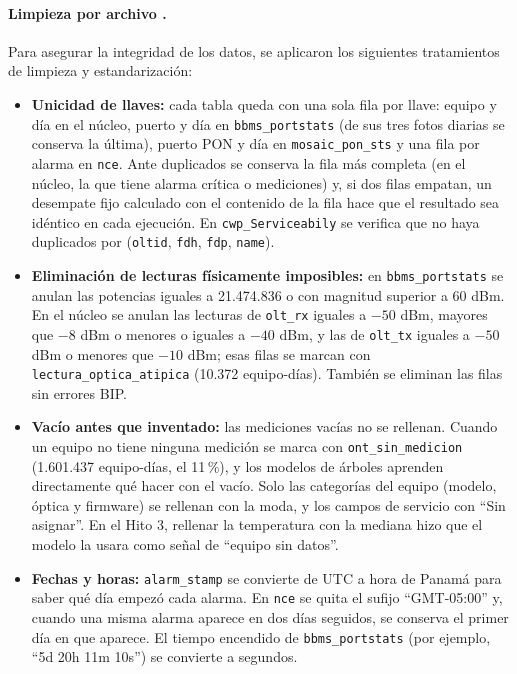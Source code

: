 \documentclass[12pt,a4paper]{article}
\begin{document}
\paragraph{Limpieza por archivo .}
Para asegurar la integridad de los datos, se aplicaron los siguientes tratamientos de limpieza y estandarización:
\begin{itemize}
    \item \textbf{Unicidad de llaves:} cada tabla queda con una sola fila por llave: equipo y día en el núcleo, puerto y día en \texttt{bbms\_portstats} (de sus tres fotos diarias se conserva la última), puerto PON y día en \texttt{mosaic\_pon\_sts} y una fila por alarma en \texttt{nce}. Ante duplicados se conserva la fila más completa (en el núcleo, la que tiene alarma crítica o mediciones) y, si dos filas empatan, un desempate fijo calculado con el contenido de la fila hace que el resultado sea idéntico en cada ejecución. En \texttt{cwp\_Serviceabily} se verifica que no haya duplicados por (\texttt{oltid}, \texttt{fdh}, \texttt{fdp}, \texttt{name}).
    \item \textbf{Eliminación de lecturas físicamente imposibles:} en \texttt{bbms\_portstats} se anulan las potencias iguales a 21.474.836 o con magnitud superior a 60 dBm. En el núcleo se anulan las lecturas de \texttt{olt\_rx} iguales a $-50$ dBm, mayores que $-8$ dBm o menores o iguales a $-40$ dBm, y las de \texttt{olt\_tx} iguales a $-50$ dBm o menores que $-10$ dBm; esas filas se marcan con \texttt{lectura\_optica\_atipica} (10.372 equipo-días). También se eliminan las filas sin errores BIP.
    \item \textbf{Vacío antes que inventado:} las mediciones vacías no se rellenan. Cuando un equipo no tiene ninguna medición se marca con \texttt{ont\_sin\_medicion} (1.601.437 equipo-días, el 11\,\%), y los modelos de árboles aprenden directamente qué hacer con el vacío. Solo las categorías del equipo (modelo, óptica y firmware) se rellenan con la moda, y los campos de servicio con ``Sin asignar''. En el Hito 3, rellenar la temperatura con la mediana hizo que el modelo la usara como señal de ``equipo sin datos''.
    \item \textbf{Fechas y horas:} \texttt{alarm\_stamp} se convierte de UTC a hora de Panamá para saber qué día empezó cada alarma. En \texttt{nce} se quita el sufijo ``GMT-05:00'' y, cuando una misma alarma aparece en dos días seguidos, se conserva el primer día en que aparece. El tiempo encendido de \texttt{bbms\_portstats} (por ejemplo, ``5d 20h 11m 10s'') se convierte a segundos.
\end{itemize}
\end{document}

